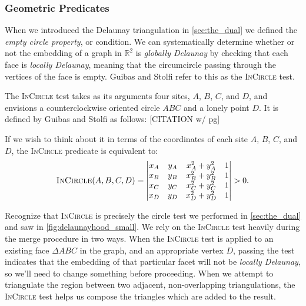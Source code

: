 \documentclass[12pt,twoside]{reedthesis}
\begin{document}
  \subsubsection{Geometric Predicates}
  \label{ssub:geo_pred}
    When we introduced the Delaunay triangulation in \cref{sec:the_dual} we defined the \emph{empty circle property}, or condition. We can systematically determine whether or not the embedding of a graph in $\mathds{R}^2$ is \emph{globally Delaunay} by checking that each face is \emph{locally Delaunay}, meaning that the circumcircle passing through the vertices of the face is empty. Guibas and Stolfi refer to this as the \textsc{InCircle} test.\par

    The \textsc{InCircle} test takes as its arguments four sites, $A$, $B$, $C$, and $D$, and envisions a counterclockwise oriented circle $ABC$ and a lonely point $D$. It is defined by Guibas and Stolfi as follows:  [CITATION w/ pg]
  
    If we wish to think about it in terms of the coordinates of each site $A$, $B$, $C$, and $D$, the \textsc{InCircle} predicate is equivalent to:
    $$
    \textsc{InCircle}(A,B,C,D) =
    \begin{vmatrix}
    x_{A} & y_{A} & x_{A}^2 + y_{A}^2 & 1 \\
    x_{B} & y_{B} & x_{B}^2 + y_{B}^2 & 1 \\
    x_{C} & y_{C} & x_{C}^2 + y_{C}^2 & 1 \\  
    x_{D} & y_{D} & x_{D}^2 + y_{D}^2 & 1 \\  
    \end{vmatrix} > 0.
    $$  

    Recognize that \textsc{InCircle} is precisely the circle test we performed in \cref{sec:the_dual} and saw in \cref{fig:delaunayhood_small}. We rely on the \textsc{InCircle} test heavily during the merge procedure in two ways. When the \textsc{InCircle} test is applied to an existing face $\Delta ABC$ in the graph, and an appropriate vertex $D$, passing the test indicates that the embedding of that particular facet will not be \emph{locally Delaunay}, so we'll need to change something before proceeding. When we attempt to triangulate the region between two adjacent, non-overlapping triangulations, the \textsc{InCircle} test helps us compose the triangles which are added to the result.\par
\end{document}
